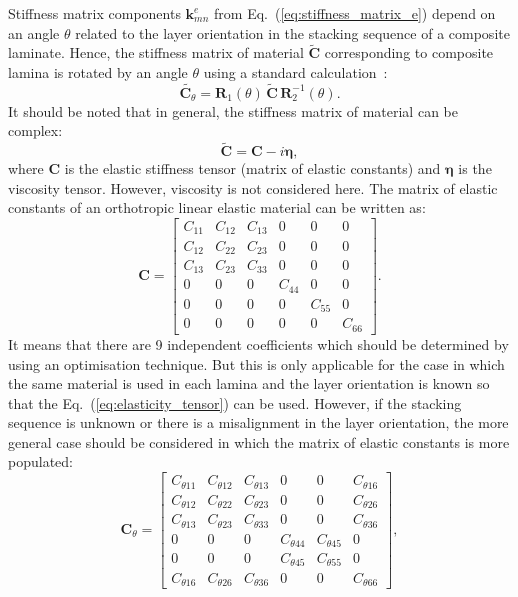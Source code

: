 \documentclass[preprint,12pt]{elsarticle}
\newcommand{\matr}[1]{\mathbf{#1}} %
\newcommand{\bs}[1]{\boldsymbol{#1}}
\begin{document}
Stiffness matrix components \(\matr{k}_{mn}^e\) from Eq.~(\ref{eq:stiffness_matrix_e}) depend on an angle \(\theta\) related to the layer orientation in the stacking sequence of a composite laminate. 
Hence, the stiffness matrix of material \(\tilde{\matr{C}}\) corresponding to composite lamina is rotated by an angle \(\theta\) using a standard calculation~\cite{Bartoli2006,Taupin2011}:
 \begin{equation}
	\tilde{ \matr{C}_{\theta}}= \matr{R}_1(\theta) \,\tilde{\matr{C}} \,\matr{R}_2^{-1}(\theta).
	 \label{eq:elasticity_tensor}
 \end{equation}
 It should be noted that in general, the stiffness matrix of material can be complex:
 \begin{equation}
 \tilde{\matr{C}}= \matr{C} - i \bs{\eta},
 \label{eq:complex_elasticity_tensor}
 \end{equation}
 where \(\matr{C} \) is the elastic stiffness tensor (matrix of elastic constants) and \(\bs{\eta}\) is the viscosity tensor. 
 However, viscosity is not considered here. 
The matrix of elastic constants of an orthotropic linear elastic material can be written as:
 \begin{equation}
 \matr{C} = \left[\begin{array}{cccccc} C_{11} & C_{12}& C_{13} & 0&0&0\\[2pt]
 C_{12}& C_{22} & C_{23}& 0&0&0\\[2pt]
 C_{13}&C_{23}&C_{33}&0&0&0\\[2pt]
 0& 0 &0&C_{44}& 0&0\\[2pt]
 0&0&0&0&C_{55}&0\\[2pt]
  0&0&0&0&0&C_{66}
  \end{array}\right]. 
  \label{eq:elastic_constatns}
 \end{equation} 
 It means that there are 9 independent coefficients which should be determined by using an optimisation technique. 
 But this is only applicable for the case in which the same material is used in each lamina and the layer orientation is known so that the Eq.~(\ref{eq:elasticity_tensor}) can be used. 
 However, if the stacking sequence is unknown or there is a misalignment in the layer orientation, the more general case should be considered in which the matrix of elastic constants is more populated:
 \begin{equation}
 \matr{C}_{\theta} = \left[\begin{array}{cccccc} C_{\theta 11} & C_{\theta 12}& C_{\theta 13} & 0&0&C_{\theta 16}\\[2pt]
 C_{\theta 12}& C_{\theta 22} & C_{\theta 23}& 0 &0&C_{\theta 26}\\[2pt]
 C_{\theta 13}&C_{\theta 23}&C_{\theta 33}&0&0&C_{\theta 36}\\[2pt]
 0& 0&0&C_{\theta 44}& C_{\theta 45}&0\\[2pt]
 0&0&0&C_{\theta 45}&C_{\theta 55}&0\\[2pt]
 C_{\theta 16}&C_{\theta 26} &C_{\theta 36}&0&0&C_{\theta 66}
 \end{array}\right], 
 \label{eq:elastic_constatns_theta}
 \end{equation} 
\end{document}
